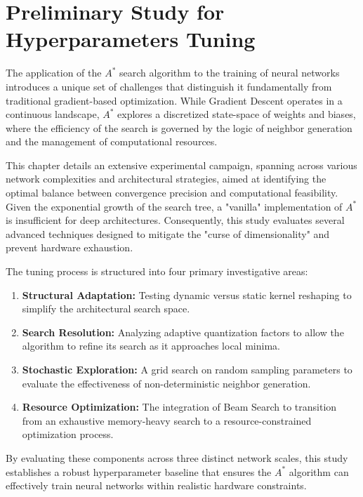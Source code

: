 
\chapter{Preliminary Study for Hyperparameters Tuning}
\label{chap:hyperparameters_tuning}

The application of the $A^*$ search algorithm to the training of neural networks introduces a unique set of challenges that distinguish it fundamentally from traditional gradient-based optimization. While Gradient Descent operates in a continuous landscape, $A^*$ explores a discretized state-space of weights and biases, where the efficiency of the search is governed by the logic of neighbor generation and the management of computational resources.

This chapter details an extensive experimental campaign, spanning across various network complexities and architectural strategies, aimed at identifying the optimal balance between convergence precision and computational feasibility. Given the exponential growth of the search tree, a "vanilla" implementation of $A^*$ is insufficient for deep architectures. Consequently, this study evaluates several advanced techniques designed to mitigate the "curse of dimensionality" and prevent hardware exhaustion.

The tuning process is structured into four primary investigative areas:
\begin{enumerate}
    \item \textbf{Structural Adaptation:} Testing dynamic versus static kernel reshaping to simplify the architectural search space.
    \item \textbf{Search Resolution:} Analyzing adaptive quantization factors to allow the algorithm to refine its search as it approaches local minima.
    \item \textbf{Stochastic Exploration:} A grid search on random sampling parameters to evaluate the effectiveness of non-deterministic neighbor generation.
    \item \textbf{Resource Optimization:} The integration of Beam Search to transition from an exhaustive memory-heavy search to a resource-constrained optimization process.
\end{enumerate}

By evaluating these components across three distinct network scales, this study establishes a robust hyperparameter baseline that ensures the $A^*$ algorithm can effectively train neural networks within realistic hardware constraints.

